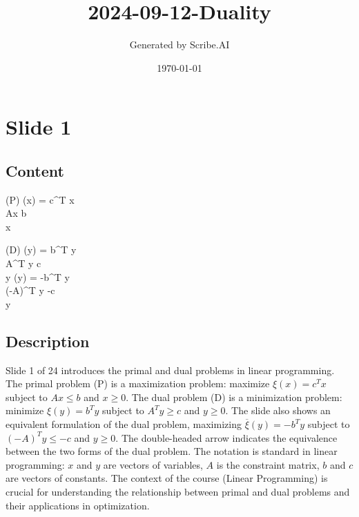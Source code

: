 \documentclass{article}%
\title{2024{-}09{-}12{-}Duality}%
\author{Generated by Scribe.AI}%
\date{\today}%
\begin{document}
%
\normalsize%
\maketitle%
\section{Slide 1}%
\label{sec:Slide1}%
\subsection{Content}%

\underline{}

(P) \quad \max \quad \xi(x) = c^T x \\
 \quad Ax \leq b \\
\quad x 

(D) \quad \min \quad \xi(y) = b^T y \\
 \quad A^T y \geq c \\
\quad y 
\iff
\quad \max \quad \overline{\xi}(y) = -b^T y \\
 \quad (-A)^T y \leq -c \\
\quad y 
%
\subsection{Description}%
Slide 1 of 24 introduces the primal and dual problems in linear programming.  The primal problem (P) is a maximization problem: maximize $\xi(x) = c^T x$ subject to $Ax \leq b$ and $x \geq 0$. The dual problem (D) is a minimization problem: minimize $\xi(y) = b^T y$ subject to $A^T y \geq c$ and $y \geq 0$.  The slide also shows an equivalent formulation of the dual problem, maximizing $\overline{\xi}(y) = -b^T y$ subject to $(-A)^T y \leq -c$ and $y \geq 0$. The double-headed arrow indicates the equivalence between the two forms of the dual problem. The notation is standard in linear programming: $x$ and $y$ are vectors of variables, $A$ is the constraint matrix, $b$ and $c$ are vectors of constants. The context of the course (Linear Programming) is crucial for understanding the relationship between primal and dual problems and their applications in optimization.%
\end{document}
